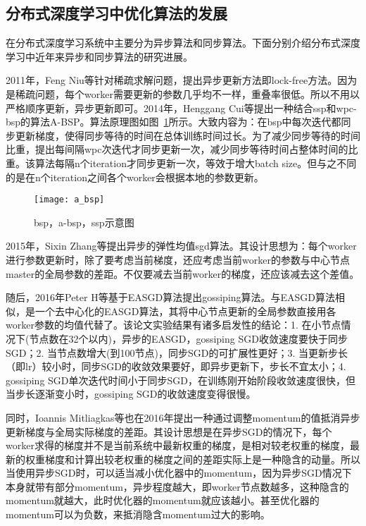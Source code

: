 \subsection{分布式深度学习中优化算法的发展}
在分布式深度学习系统中主要分为异步算法和同步算法。下面分别介绍分布式深度学习中近年来异步和同步算法的研究进展。

2011年，Feng Niu等针对稀疏求解问题，提出异步更新方法即lock-free方法。因为是稀疏问题，每个worker需要更新的参数几乎均不一样，重叠率很低。所以不用以严格顺序更新，异步更新即可。2014年，Henggang Cui等提出一种结合ssp和wpc-bsp的算法A-BSP。算法原理图如图~\ref{fig:a_bsp}所示。大致内容为：在bsp中每次迭代都同步更新梯度，使得同步等待的时间在总体训练时间过长。为了减少同步等待的时间比重，提出每间隔wpc次迭代才同步更新一次，减少同步等待时间占整体时间的比重。该算法每隔n个iteration才同步更新一次，等效于增大batch size。但与之不同的是在n个iteration之间各个worker会根据本地的参数更新。

\begin{figure}[htp]
\centering
\texttt{[image: a\_bsp]}
\caption{bsp，a-bsp，ssp示意图}
\label{fig:a_bsp}
\end{figure}
2015年，Sixin Zhang等提出异步的弹性均值sgd算法。其设计思想为：每个worker进行参数更新时，除了要考虑当前梯度，还应考虑当前worker的参数与中心节点master的全局参数的差距。不仅要减去当前worker的梯度，还应该减去这个差值。

随后，2016年Peter H等基于EASGD算法提出gossiping算法。与EASGD算法相似，是一个去中心化的EASGD算法，其将中心节点更新的全局参数直接用各worker参数的均值代替了。该论文实验结果有诸多启发性的结论：1. 在小节点情况下(节点数在32个以内)，异步的EASGD，gossiping SGD收敛速度要快于同步SGD；2. 当节点数增大(到100节点)，同步SGD的可扩展性更好；3. 当更新步长（即lr）较小时，同步SGD的收敛效果要好，即异步更新下，步长不宜太小；4. gossiping SGD单次迭代时间小于同步SGD，在训练刚开始阶段收敛速度很快，但当步长逐渐变小时，gossiping SGD的收敛速度变得很慢。

同时，Ioannis Mitliagkas等也在2016年提出一种通过调整momentum的值抵消异步更新梯度与全局实际梯度的差距。其设计思想是在异步SGD的情况下，每个worker求得的梯度并不是当前系统中最新权重的梯度，是相对较老权重的梯度，最新的权重梯度和计算出较老权重的梯度之间的差距实际上是一种隐含的动量。所以当使用异步SGD时，可以适当减小优化器中的momentum，因为异步SGD情况下本身就带有部分momentum，异步程度越大，即worker节点数越多，这种隐含的momentum就越大，此时优化器的momentum就应该越小。甚至优化器的momentum可以为负数，来抵消隐含momentum过大的影响。

